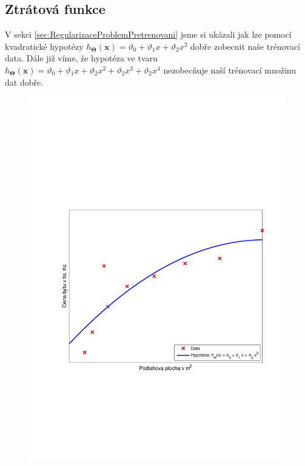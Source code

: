 \subsection{Ztrátová funkce}
\par{V sekci \ref{sec:RegularizaceProblemPretrenovani} jsme si ukázali jak lze pomocí kvadratické hypotézy $h_{\bm{\Theta}} \left( \bm{x} \right) = \vartheta_0 + \vartheta_1 x + \vartheta_2 x^2$ dobře zobecnit naše trénovací data. Dále již víme, že hypotéza ve tvaru $h_{\bm{\Theta}} \left( \bm{x} \right) = \vartheta_0 + \vartheta_1 x + \vartheta_2 x^2 + \vartheta_2 x^3 + \vartheta_2 x^4$ nezobecňuje naší trénovací množinu dat dobře.}
\begin{figure}[!ht]
	\centering
	\begin{minipage}[t]{0.48\textwidth}
		\includegraphics[width = \textwidth, trim = 2.5cm 7cm 2cm 9cm]{./Img/Regularizace/Pretrenovani1D/regrese_2.pdf}

\end{minipage}
\end{figure}
